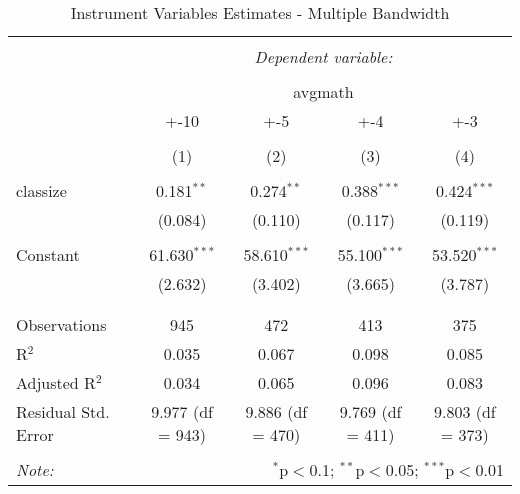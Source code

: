 
\begin{table}[!htbp] \centering 
  \caption{Instrument Variables Estimates - Multiple Bandwidth} 
  \label{} 
\begin{tabular}{@{\extracolsep{5pt}}lcccc} 
\\[-1.8ex]\hline 
\hline \\[-1.8ex] 
 & \multicolumn{4}{c}{\textit{Dependent variable:}} \\ 
\cline{2-5} 
\\[-1.8ex] & \multicolumn{4}{c}{avgmath} \\ 
 & +-10 & +-5 & +-4 & +-3 \\ 
\\[-1.8ex] & (1) & (2) & (3) & (4)\\ 
\hline \\[-1.8ex] 
 classize & 0.181$^{**}$ & 0.274$^{**}$ & 0.388$^{***}$ & 0.424$^{***}$ \\ 
  & (0.084) & (0.110) & (0.117) & (0.119) \\ 
  & & & & \\ 
 Constant & 61.630$^{***}$ & 58.610$^{***}$ & 55.100$^{***}$ & 53.520$^{***}$ \\ 
  & (2.632) & (3.402) & (3.665) & (3.787) \\ 
  & & & & \\ 
\hline \\[-1.8ex] 
Observations & 945 & 472 & 413 & 375 \\ 
R$^{2}$ & 0.035 & 0.067 & 0.098 & 0.085 \\ 
Adjusted R$^{2}$ & 0.034 & 0.065 & 0.096 & 0.083 \\ 
Residual Std. Error & 9.977 (df = 943) & 9.886 (df = 470) & 9.769 (df = 411) & 9.803 (df = 373) \\ 
\hline 
\hline \\[-1.8ex] 
\textit{Note:}  & \multicolumn{4}{r}{$^{*}$p$<$0.1; $^{**}$p$<$0.05; $^{***}$p$<$0.01} \\ 
\end{tabular} 
\end{table} 

